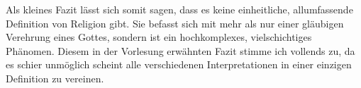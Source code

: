 Als kleines Fazit lässt sich somit sagen, dass es keine einheitliche, allumfassende Definition von Religion gibt. Sie befasst sich mit mehr als nur einer gläubigen Verehrung eines Gottes, sondern ist ein hochkomplexes, vielschichtiges Phänomen. Diesem in der Vorlesung erwähnten Fazit stimme ich vollends zu, da es schier unmöglich scheint alle verschiedenen Interpretationen in einer einzigen Definition zu vereinen.\\